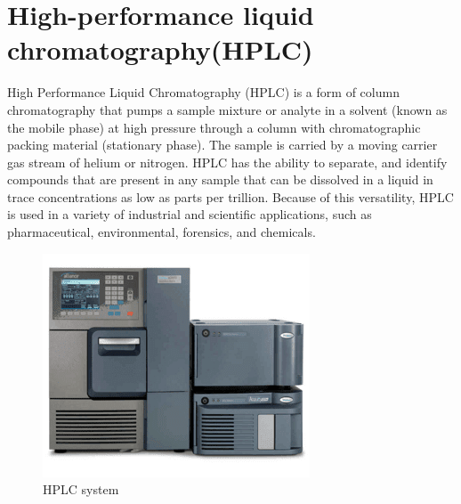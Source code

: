 \documentclass{article}
\begin{document}
\section{High-performance liquid chromatography(HPLC)}

High Performance Liquid Chromatography (HPLC) is a form of column chromatography that pumps a sample mixture or analyte in a solvent (known as the mobile phase) at high pressure through a column with chromatographic packing material (stationary phase). The sample is carried by a moving carrier gas stream of helium or nitrogen. HPLC has the ability to separate, and identify compounds that are present in any sample that can be dissolved in a liquid in trace concentrations as low as parts per trillion. Because of this versatility, HPLC is used in a variety of industrial and scientific applications, such as pharmaceutical, environmental, forensics, and chemicals.
\begin{figure} [h]
    \centering
    \includegraphics{HPLC-system.png}
    \caption{HPLC system}
    \label{fig:hplc system}
\end{figure}
\end{document}
